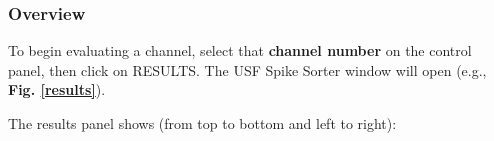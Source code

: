 \documentclass[12pt]{article}
\begin{document}
\subsubsection{Overview}
\label{overview}
To begin evaluating a channel, select that \textbf{channel number} on
the control panel, then click on \textsf{RESULTS}. The USF Spike
Sorter window will open (e.g., \textbf{Fig. \ref{results}}).
\begin{center}
  \label{results}
\end{center}
\clearpage

The results panel shows (from top to bottom and left to right):
\end{document}
